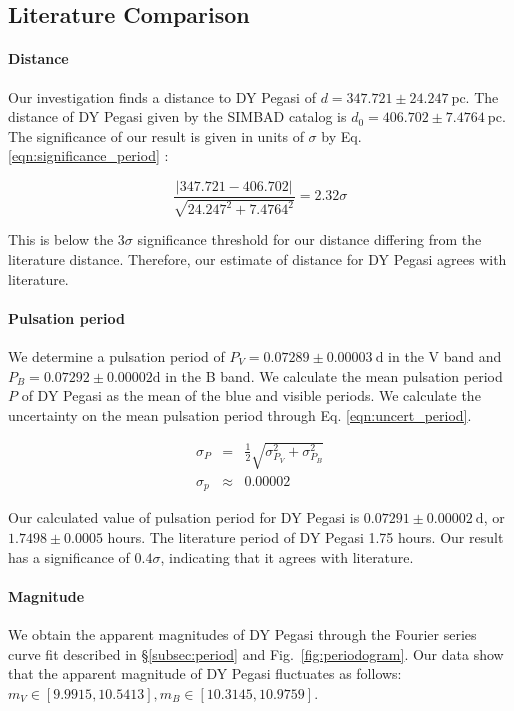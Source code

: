\documentclass[twocolumn]{aastex631}
\begin{document}
\subsection{Literature Comparison}

\paragraph{Distance} Our investigation finds a distance to DY Pegasi of $d = 347.721 \pm 24.247 \ \mathrm{pc}$. The distance of DY Pegasi given by the SIMBAD catalog is $d_0 = 406.702 \pm 7.4764 \ \mathrm{pc}$. The significance of our result is given in units of $\sigma$ by Eq. \ref{eqn:significance_period} \citep{vdl_2022}:

\begin{equation} \label{eqn:significance_period}
    \frac{ |347.721 - 406.702| }{ \sqrt{ 24.247^2 + 7.4764^2 } } = 2.32 \sigma
\end{equation}

This is below the $3\sigma$ significance threshold for our distance differing from the literature distance. Therefore, our estimate of distance for DY Pegasi agrees with literature.

\paragraph{Pulsation period} We determine a pulsation period of $P_V = 0.07289 \pm 0.00003 \ \mathrm{d}$ in the V band and
$P_B = 0.07292 \pm 0.00002 \mathrm{d}$ in the B band. We calculate the mean pulsation period $P$ of DY Pegasi as the mean of the blue and visible periods. We calculate the uncertainty on the mean pulsation period through Eq. \ref{eqn:uncert_period}.

\begin{eqnarray} \label{eqn:uncert_period}
    \sigma_P &=& \frac{1}{2} \sqrt{\sigma_{P_V}^2 + \sigma_{P_B}^2} \\
    \sigma_p &\approx& 0.00002
\end{eqnarray}

Our calculated value of pulsation period for DY Pegasi is $0.07291 \pm 0.00002 \ \mathrm{d}$, or $1.7498 \pm 0.0005$ hours. The literature period of DY Pegasi 1.75 hours. \citep{2017_catalog} Our result has a significance of $0.4\sigma$, indicating that it agrees with literature. 

\paragraph{Magnitude} We obtain the apparent magnitudes of DY Pegasi through the Fourier series curve fit described in \S \ref{subsec:period} and Fig.\ \ref{fig:periodogram}. Our data show that the apparent magnitude of DY Pegasi fluctuates as follows: $m_V \in [9.9915, 10.5413], m_B \in [10.3145, 10.9759]$. 
\end{document}
